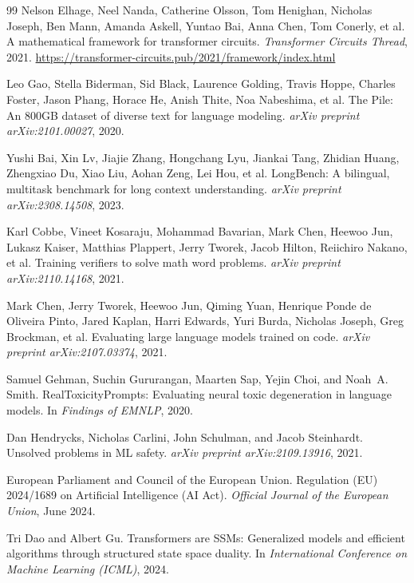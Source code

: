 \documentclass[10pt,twocolumn]{article}
\begin{document}
\begin{thebibliography}{99}
Nelson Elhage, Neel Nanda, Catherine Olsson, Tom Henighan, Nicholas Joseph, Ben Mann, Amanda Askell, Yuntao Bai, Anna Chen, Tom Conerly, et al.
\newblock A mathematical framework for transformer circuits.
\newblock \emph{Transformer Circuits Thread}, 2021.
\newblock \url{https://transformer-circuits.pub/2021/framework/index.html}

Leo Gao, Stella Biderman, Sid Black, Laurence Golding, Travis Hoppe, Charles Foster, Jason Phang, Horace He, Anish Thite, Noa Nabeshima, et al.
\newblock The Pile: An 800GB dataset of diverse text for language modeling.
\newblock \emph{arXiv preprint arXiv:2101.00027}, 2020.

Yushi Bai, Xin Lv, Jiajie Zhang, Hongchang Lyu, Jiankai Tang, Zhidian Huang, Zhengxiao Du, Xiao Liu, Aohan Zeng, Lei Hou, et al.
\newblock LongBench: A bilingual, multitask benchmark for long context understanding.
\newblock \emph{arXiv preprint arXiv:2308.14508}, 2023.

Karl Cobbe, Vineet Kosaraju, Mohammad Bavarian, Mark Chen, Heewoo Jun, Lukasz Kaiser, Matthias Plappert, Jerry Tworek, Jacob Hilton, Reiichiro Nakano, et al.
\newblock Training verifiers to solve math word problems.
\newblock \emph{arXiv preprint arXiv:2110.14168}, 2021.

Mark Chen, Jerry Tworek, Heewoo Jun, Qiming Yuan, Henrique Ponde de Oliveira Pinto, Jared Kaplan, Harri Edwards, Yuri Burda, Nicholas Joseph, Greg Brockman, et al.
\newblock Evaluating large language models trained on code.
\newblock \emph{arXiv preprint arXiv:2107.03374}, 2021.

Samuel Gehman, Suchin Gururangan, Maarten Sap, Yejin Choi, and Noah~A. Smith.
\newblock RealToxicityPrompts: Evaluating neural toxic degeneration in language models.
\newblock In \emph{Findings of EMNLP}, 2020.

Dan Hendrycks, Nicholas Carlini, John Schulman, and Jacob Steinhardt.
\newblock Unsolved problems in ML safety.
\newblock \emph{arXiv preprint arXiv:2109.13916}, 2021.

European Parliament and Council of the European Union.
\newblock Regulation (EU) 2024/1689 on Artificial Intelligence (AI Act).
\newblock \emph{Official Journal of the European Union}, June 2024.

Tri Dao and Albert Gu.
\newblock Transformers are SSMs: Generalized models and efficient algorithms through structured state space duality.
\newblock In \emph{International Conference on Machine Learning (ICML)}, 2024.


\end{thebibliography}
\end{document}
